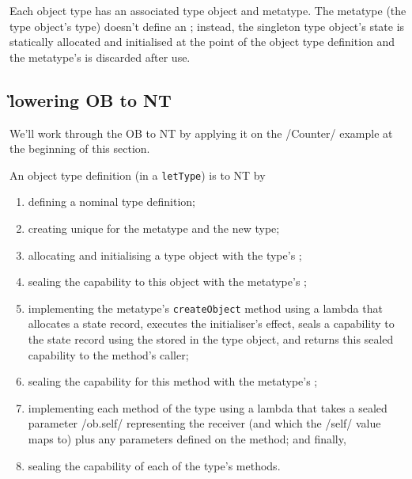 \documentclass[main.tex]{subfiles}
\begin{document}
Each object type has an associated type object and metatype. The metatype (the type object's type) doesn't define an ; instead, the singleton type object's state is statically allocated and initialised at the point of the object type definition and the metatype's  is discarded after use.

\subsection{\G{lowering} OB to NT}
We'll work through the OB to NT  by applying it on the \iil/Counter/ example at the beginning of this section.

An object type definition (in a \texttt{letType}) is \lowered{} to NT by
\begin{enumerate}[nosep]
	
	\item defining a nominal type definition;
	
	\item creating unique  for the metatype and the new type;
	
	\item allocating and initialising a type object with the type's ;
	\item sealing the capability to this object with the metatype's ;
	
	\item implementing the metatype's \texttt{createObject} method using a lambda that allocates a state record, executes the initialiser's effect, seals a capability to the state record using the  stored in the type object, and returns this sealed capability to the method's caller;
	\item sealing the capability for this method with the metatype's ;
	
	\item implementing each method of the type using a lambda that takes a sealed parameter \iil/ob.self/ representing the receiver (and which the \iil/self/ value maps to) plus any parameters defined on the method; and finally,
	\item sealing the capability of each of the type's methods.
	
\end{enumerate}
\end{document}
